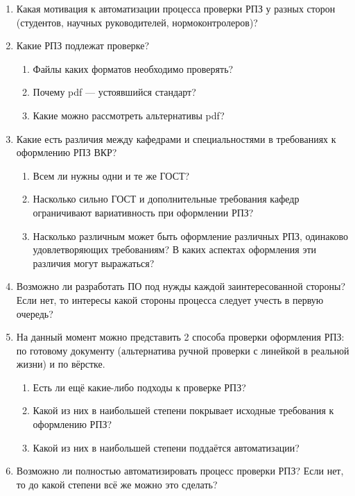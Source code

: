\begin{enumerate}[label*=\arabic*.]
	\item Какая мотивация к автоматизации процесса проверки РПЗ у разных сторон (студентов, научных руководителей, нормоконтролеров)?
	
	\item Какие РПЗ подлежат проверке?
	\begin{enumerate}[label*=\arabic*.]
		\item Файлы каких форматов необходимо проверять?
		\item Почему pdf --- устоявшийся стандарт?
		\item Какие можно рассмотреть альтернативы pdf?
	\end{enumerate}
	
	\item Какие есть различия между кафедрами и специальностями в требованиях к оформлению РПЗ ВКР? 
	\begin{enumerate}[label*=\arabic*.]
		\item Всем ли нужны одни и те же ГОСТ?
		\item Насколько сильно ГОСТ и дополнительные требования кафедр ограничивают вариативность при оформлении РПЗ?
		\item Насколько различным может быть оформление различных РПЗ, одинаково удовлетворяющих требованиям? В каких аспектах оформления эти различия могут выражаться?
	\end{enumerate}
	
	\item Возможно ли разработать ПО под нужды каждой заинтересованной стороны? Если нет, то интересы какой стороны процесса следует учесть в первую очередь?
	
	\item На данный момент можно представить 2 способа проверки оформления РПЗ: по готовому документу (альтернатива ручной проверки с линейкой в реальной жизни) и по вёрстке.
	\begin{enumerate}[label*=\arabic*.]
		\item Есть ли ещё какие-либо подходы к проверке РПЗ?
		\item Какой из них в наибольшей степени покрывает исходные требования к оформлению РПЗ?
		\item Какой из них в наибольшей степени поддаётся автоматизации?
	\end{enumerate}
	
	\item Возможно ли полностью автоматизировать процесс проверки РПЗ? Если нет, то до какой степени всё же можно это сделать?
	

\end{enumerate}
